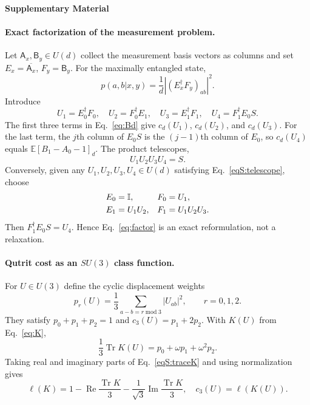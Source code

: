 \documentclass[aps,prl,reprint,superscriptaddress,nofootinbib]{revtex4-2}
\newcommand{\Tr}{\operatorname{Tr}}
\newcommand{\id}{\mathbb{I}}
\begin{document}
\clearpage
\onecolumngrid
\begin{center}
{\large\bfseries Supplementary Material}
\end{center}

\setcounter{equation}{0}
\renewcommand{\theequation}{S\arabic{equation}}
\renewcommand{\theHequation}{S.\arabic{equation}}

\paragraph{Exact factorization of the measurement problem.}
Let $\mathsf A_x,\mathsf B_y\in U(d)$ collect the measurement basis vectors as columns and set $E_x=\overline{\mathsf A_x}$, $F_y=\mathsf B_y$. For the maximally entangled state,
\begin{equation}
p(a,b\vert x,y)=\frac1d\left|\left(E_x^\dagger F_y\right)_{ab}\right|^2.
\label{eqS:prob}
\end{equation}
Introduce
\begin{equation}
U_1=E_0^\dagger F_0,\quad
U_2=F_0^\dagger E_1,\quad
U_3=E_1^\dagger F_1,\quad
U_4=F_1^\dagger E_0S.
\label{eqS:U}
\end{equation}
The first three terms in Eq.~\eqref{eq:Bd} give $c_d(U_1)$, $c_d(U_2)$, and $c_d(U_3)$. For the last term, the $j$th column of $E_0S$ is the $(j-1)$th column of $E_0$, so $c_d(U_4)$ equals $\mathbb E[B_1-A_0-1]_d$. The product telescopes,
\begin{equation}
U_1U_2U_3U_4=S.
\label{eqS:telescope}
\end{equation}
Conversely, given any $U_1,U_2,U_3,U_4\in U(d)$ satisfying Eq.~\eqref{eqS:telescope}, choose
\begin{align}
E_0&=\id, & F_0&=U_1,\notag\\
E_1&=U_1U_2, & F_1&=U_1U_2U_3.
\end{align}
Then $F_1^\dagger E_0S=U_4$. Hence Eq.~\eqref{eq:factor} is an exact reformulation, not a relaxation.

\paragraph{Qutrit cost as an $SU(3)$ class function.}
For $U\in U(3)$ define the cyclic displacement weights
\begin{equation}
p_r(U)=\frac13\sum_{a-b=r\;\mathrm{mod}\;3}|U_{ab}|^2,
\qquad r=0,1,2.
\label{eqS:pr}
\end{equation}
They satisfy $p_0+p_1+p_2=1$ and $c_3(U)=p_1+2p_2$. With $K(U)$ from Eq.~\eqref{eq:K},
\begin{equation}
\frac13\Tr K(U)=p_0+\omega p_1+\omega^2p_2.
\label{eqS:traceK}
\end{equation}
Taking real and imaginary parts of Eq.~\eqref{eqS:traceK} and using normalization gives
\begin{equation}
\ell(K)=1-\operatorname{Re}\frac{\Tr K}{3}
-\frac1{\sqrt3}\operatorname{Im}\frac{\Tr K}{3},
\quad c_3(U)=\ell(K(U)).
\label{eqS:ell}
\end{equation}
\end{document}
